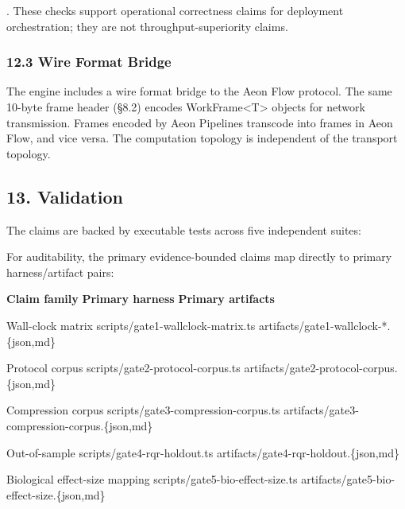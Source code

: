 \documentclass[
]{article}
\begin{document}
. These checks support operational correctness claims for deployment
orchestration; they are not throughput-superiority claims.

\subsubsection{\texorpdfstring{\textbf{12.3 Wire Format
Bridge}}{12.3 Wire Format Bridge}}\label{wire-format-bridge}

The engine includes a wire format bridge to the Aeon Flow protocol. The
same 10-byte frame header (§8.2) encodes
WorkFrame\textless T\textgreater{} objects for network transmission.
Frames encoded by Aeon Pipelines transcode into frames in Aeon Flow, and
vice versa. The computation topology is independent of the transport
topology.

\subsection{\texorpdfstring{\textbf{13.
Validation}}{13. Validation}}\label{validation}

The claims are backed by executable tests across five independent
suites:

For auditability, the primary evidence-bounded claims map directly to
primary harness/artifact pairs:

\textbf{Claim family} \textbar{} \textbf{Primary harness} \textbar{}
\textbf{Primary artifacts} \textbar{}

Wall-clock matrix \textbar{} scripts/gate1-wallclock-matrix.ts
\textbar{} artifacts/gate1-wallclock-*.\{json,md\} \textbar{}

Protocol corpus \textbar{} scripts/gate2-protocol-corpus.ts \textbar{}
artifacts/gate2-protocol-corpus.\{json,md\} \textbar{}

Compression corpus \textbar{} scripts/gate3-compression-corpus.ts
\textbar{} artifacts/gate3-compression-corpus.\{json,md\} \textbar{}

Out-of-sample \textbar{} scripts/gate4-rqr-holdout.ts \textbar{}
artifacts/gate4-rqr-holdout.\{json,md\} \textbar{}

Biological effect-size mapping \textbar{}
scripts/gate5-bio-effect-size.ts \textbar{}
artifacts/gate5-bio-effect-size.\{json,md\} \textbar{}
\end{document}
